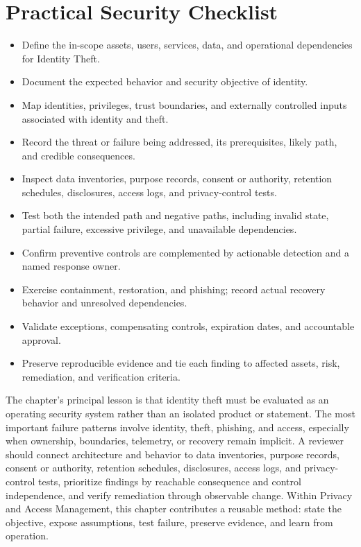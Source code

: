 \documentclass[11pt]{article}
\begin{document}
\section*{Practical Security Checklist}
\begin{itemize}[label=$\square$]
\item Define the in-scope assets, users, services, data, and operational dependencies for Identity Theft.
\item Document the expected behavior and security objective of identity.
\item Map identities, privileges, trust boundaries, and externally controlled inputs associated with identity and theft.
\item Record the threat or failure being addressed, its prerequisites, likely path, and credible consequences.
\item Inspect data inventories, purpose records, consent or authority, retention schedules, disclosures, access logs, and privacy-control tests.
\item Test both the intended path and negative paths, including invalid state, partial failure, excessive privilege, and unavailable dependencies.
\item Confirm preventive controls are complemented by actionable detection and a named response owner.
\item Exercise containment, restoration, and phishing; record actual recovery behavior and unresolved dependencies.
\item Validate exceptions, compensating controls, expiration dates, and accountable approval.
\item Preserve reproducible evidence and tie each finding to affected assets, risk, remediation, and verification criteria.
\end{itemize}
\begin{synthesisbox}
The chapter's principal lesson is that identity theft must be evaluated as an operating security system rather than an isolated product or statement. The most important failure patterns involve identity, theft, phishing, and access, especially when ownership, boundaries, telemetry, or recovery remain implicit. A reviewer should connect architecture and behavior to data inventories, purpose records, consent or authority, retention schedules, disclosures, access logs, and privacy-control tests, prioritize findings by reachable consequence and control independence, and verify remediation through observable change. Within Privacy and Access Management, this chapter contributes a reusable method: state the objective, expose assumptions, test failure, preserve evidence, and learn from operation.
\end{synthesisbox}
\end{document}
